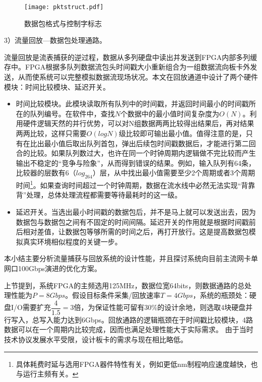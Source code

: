\begin{figure}[!ht]
	\centering 
	\vspace{-1.5mm}
	\texttt{[image: pktstruct.pdf]}
	\caption{数据包格式与控制字标志} \label{fig:pktstruct}
\end{figure}

3）流量回放---数据包处理通路。

流量回放是流表捕获的逆过程，数据从多列硬盘中读出并发送到FPGA内部多列缓存中。FPGA根据多队列数据流包头时间戳大小重新组合为一组数据流向板卡外发送，从而使系统可以完整模拟数据流现场状况。本文在回放通道中设计了两个硬件模块：时间比较模块、延迟开关。

\begin{itemize}
	\item 时间比较模块。此模块读取所有队列中的时间戳，并返回时间最小的时间戳所在的队列编号。在软件中，查找$N$个数据中的最小值时间复杂度为$ O(N) $。利用硬件逻辑天然的并行优势，可以对N组数据两两比较得出结果后，再对结果两两比较，这样只需要$ O(log N) $级比较即可输出最小值。值得注意的是，只有在比出最小值后取出队列首包，弹出后续包时间戳数据后，才能进行第二回合的比较。如果队列数过大，也许在同一个时钟周期内逻辑做不完比较而产生输出不稳定的“竞争与险象”，从而得到错误的结果。例如，输入队列有64条，比较器的层数有6（$ log_264 $）层，从中找出最小值需要至少2个周期或者3个周期时间\footnote{具体耗费时延与选用FPGA器件特性有关，例如更低nm制程响应速度越快，也与运行主频有关。}。如果查询时间超过一个时钟周期，数据在流水线中必然无法实现“背靠背”处理，总体处理流程都需要等待最耗时的这一级。
	\item 延迟开关。当选出最小时间戳的数据包后，并不是马上就可以发送出去，因为数据包与数据包之间有不固定的时间间隔。延迟开关的作用就是根据时间戳前后相对差值，让数据包等够所需的时间之后，再打开放行。这是提高数据包模拟真实环境相似程度的关键一步。
\end{itemize}

\label{chap345}

本小结主要分析流量捕获与回放系统的设计性能，并且探讨系统向目前主流网卡单网口100Gbps演进的优化方案。

上节提到，系统FPGA的主频选用125MHz，数据位宽64bits，则数据通路的总处理性能为$ P=8Gbps $。假设目标条件采集/回放速率$ T=4Gbps $，系统的瓶颈处：硬盘I/O需要扩充$ \dfrac{4}{1.5}=3 $倍，为保证性能可留有30\%的设计余地，则选取4块硬盘并行写入，总写入能力达到6Gbps。回放通路的逻辑瓶颈在于时间戳比较模块，4路数据可以在一个周期内比较完成，因而也满足处理性能大于实际需求。
由于当时技术协议发展水平受限，设计板卡的需求与现在相比略低。

